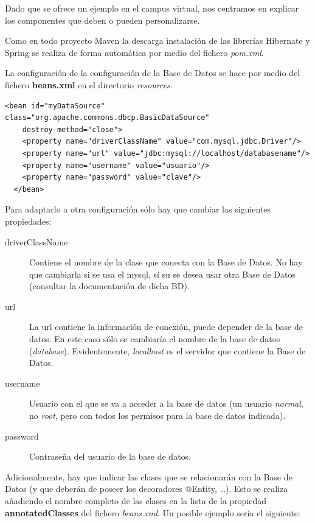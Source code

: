 \documentclass[11pt]{article}
\begin{document}
Dado que se ofrece un ejemplo en el campus virtual, nos centramos en explicar los componentes que
deben o pueden personalizarse.  


Como en todo proyecto Maven la descarga instalación de las librerías Hibernate y Spring se realiza de forma
automática por medio del fichero \emph{pom.xml}. 


La configuración de la configuración de la Base de Datos se hace por medio del fichero \textbf{beans.xml}
en el directorio \emph{resources}.


\begin{lstlisting}
<bean id="myDataSource" class="org.apache.commons.dbcp.BasicDataSource" 
    destroy-method="close">
    <property name="driverClassName" value="com.mysql.jdbc.Driver"/>
    <property name="url" value="jdbc:mysql://localhost/databasename"/>
    <property name="username" value="usuario"/>
    <property name="password" value="clave"/>
  </bean>
\end{lstlisting}


Para adaptarlo a otra configuración sólo hay que cambiar las siguientes propiedades: 




\begin{description}
\item[driverClassName] Contiene el nombre de la clase que conecta con la Base de Datos. No hay que
     cambiarla si se usa el mysql, sí su se desea usar otra Base de Datos (consultar la
     documentación de dicha BD).
\item[url] La url contiene la información de conexión, puede depender de la base de datos. En este
         caso sólo se cambiaría el nombre de la base de datos (\emph{database}). Evidentemente,
         \emph{localhost} es el servidor que contiene la Base de Datos.
\item[username] Usuario con el que se va a acceder a la base de datos (un usuario \emph{normal}, no \emph{root},
              pero con todos los permisos para la base de datos indicada).
\item[password] Contraseña del usuario de la base de datos.
\end{description}


Adicionalmente, hay que indicar las clases que se relacionarán con la Base de Datos (y que deberán 
de poseer los decoradores @Entity, \ldots{}). Esto se realiza añadiendo el nombre completo de las clases en la lista
de la propiedad \textbf{annotatedClasses} del fichero \emph{beans.xml}. Un posible ejemplo sería el siguiente:
\end{document}
